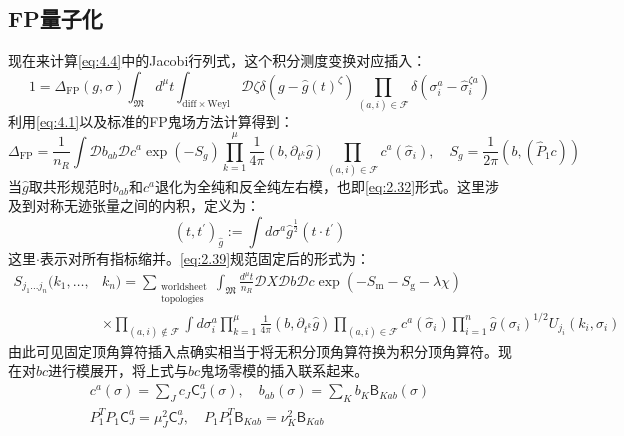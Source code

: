 \subsection{FP量子化}
现在来计算\ref{eq:4.4}中的Jacobi行列式，这个积分测度变换对应插入：
\begin{equation}
	1=\Delta_{\mathrm{FP}}(g,\sigma)\int_\mathfrak{M}d^\mu t\int_\mathrm{diff\times Weyl}\mathcal{D}\zeta\delta(g-\hat{g}(t)^\zeta)\prod_{(a,i)\in \mathcal{F}}\delta(\sigma_i^a-\hat{\sigma}_i^{\zeta a})
\end{equation}
利用\ref{eq:4.1}以及标准的FP鬼场方法计算得到：
\begin{equation}
	\label{eq:4.16}
	\Delta_{\text{FP}}=\frac{1}{n_R}\int\mathcal{D}b_{ab}\mathcal{D}c^a\exp(-S_g)\prod_{k=1}^\mu\frac{1}{4\pi}(b,\partial_{t^k}\hat{g})\prod_{(a,i)\in \mathcal{F}}c^a(\hat{\sigma}_i),\quad S_g=\frac{1}{2\pi}\left(b,(\hat{P}_1c)\right)
\end{equation}
当$\hat g$取共形规范时$b_{ab}$和$c^a$退化为全纯和反全纯左右模，也即\ref{eq:2.32}形式。这里涉及到对称无迹张量之间的内积，定义为：
\begin{equation}
	\label{eq:4.17}
	(t,t^\prime)_{\hat g}:=\int d\sigma^a {\hat g}^{\frac{1}{2}} (t\cdot t^\prime)
\end{equation}
这里$\cdot$表示对所有指标缩并。\ref{eq:2.39}规范固定后的形式为：
\begin{equation}
	\label{eq:4.18}
	\begin{aligned}
		S_{j_1...j_n}(k_1,\ldots,&k_n)=\sum_{\substack{\text{worldsheet}\\\text{topologies}}}\int_{\mathfrak{M}}\frac{d^\mu t}{n_R}\mathcal{D}X\mathcal{D}b\mathcal{D}c\exp(-S_\mathrm{m}-S_\mathrm{g}-\lambda\chi)\\&\times\prod_{(a,i)\notin \mathcal{F}}\int d\sigma_i^a\prod_{k=1}^\mu\frac{1}{4\pi}(b,\partial_{t^k}\hat{g})\prod_{(a,i)\in\mathcal{F}}c^a(\hat{\sigma}_i)\prod_{i=1}^n\hat{g}(\sigma_i)^{1/2}U_{j_i}(k_i,\sigma_i)
	\end{aligned}
\end{equation}
由此可见固定顶角算符插入点确实相当于将无积分顶角算符换为积分顶角算符。现在对$bc$进行模展开，将上式与$bc$鬼场零模的插入联系起来。
\begin{equation}
	\begin{gathered}
		c^a(\sigma)=\sum_Jc_J\mathsf{C}_J^a(\sigma),\quad b_{ab}(\sigma)=\sum_Kb_K\mathsf{B}_{Kab}(\sigma)\\
		P_1^TP_1\mathsf{C}_J^a=\mu_J^{2}\mathsf{C}_J^a,\quad P_1P_1^T\mathsf{B}_{Kab}=\nu_K^2\mathsf{B}_{Kab}
	\end{gathered}
\end{equation}
